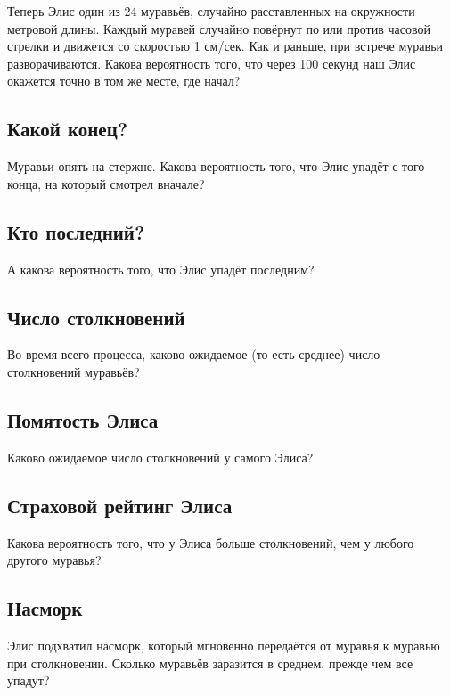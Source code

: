 Теперь Элис один из 24 муравьёв, случайно расставленных на окружности метровой длины.
Каждый муравей случайно повёрнут по или против часовой стрелки и движется со скоростью 1 см/сек.
Как и раньше, при встрече муравьи разворачиваются.
Какова вероятность того, что через 100 секунд наш Элис окажется точно в том же месте, где начал?

\subsection*{Какой конец?}

Муравьи опять на стержне.
Какова вероятность того, что Элис упадёт с того конца, на который смотрел вначале?

\subsection*{Кто последний?}

А какова вероятность того, что Элис упадёт последним?

\subsection*{Число столкновений}

Во время всего процесса, каково ожидаемое (то есть среднее) число столкновений муравьёв?

\subsection*{Помятость Элиса}

Каково ожидаемое число столкновений у самого Элиса?

\subsection*{Страховой рейтинг Элиса}

Какова вероятность того, что у Элиса больше столкновений, чем у любого другого муравья?

\subsection*{Насморк}

Элис подхватил насморк, который мгновенно передаётся от муравья к муравью при столкновении.
Сколько муравьёв заразится в среднем, прежде чем все упадут?

